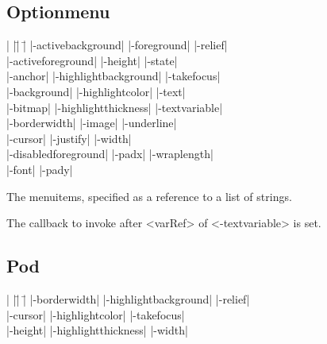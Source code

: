 \subsection*{Optionmenu}
\vspace{-4pt}

\begin{tabbing}
|                    |\=|                    |\= \kill
|-activebackground| \> |-foreground|         \> |-relief| \\
|-activeforeground| \> |-height|             \> |-state| \\
|-anchor|           \> |-highlightbackground|\> |-takefocus| \\
|-background|       \> |-highlightcolor|     \> |-text| \\
|-bitmap|           \> |-highlightthickness| \> |-textvariable| \\
|-borderwidth|      \> |-image|              \> |-underline| \\
|-cursor|           \> |-justify|            \> |-width| \\
|-disabledforeground| \> |-padx| 	     \> |-wraplength| \\
|-font| 	    \> |-pady| \\
\end{tabbing}

\vskip5pt
\begin{enum}{1cm}

 The menuitems, specified as a
reference to a list of strings.

 The callback to invoke after <varRef> of <-textvariable> is set.
 
\end{enum}

\subsection*{Pod}
\vspace{-4pt}

\begin{tabbing}
|                   |\=|                     |\= \kill
|-borderwidth| \> |-highlightbackground|     \> |-relief| \\   
|-cursor|      \> |-highlightcolor|          \> |-takefocus| \\
|-height|      \> |-highlightthickness|      \> |-width| \\
\end{tabbing}

